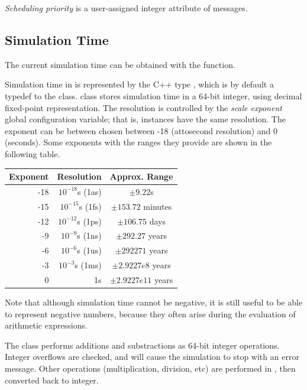 \textit{Scheduling priority} is a user-assigned integer
attribute of messages.



\subsection{Simulation Time}
\label{sec:simple-modules:simulation-time}

The current simulation time can be obtained with the  function.

Simulation time in {\opp} is represented by the C++ type ,
which is by default a typedef to the  class.
 class stores simulation time in a 64-bit integer,
using decimal fixed-point representation. The resolution is controlled
by the \textit{scale exponent} global configuration variable; that is,
 instances have the same resolution. The exponent can be
between chosen between -18 (attosecond resolution) and 0 (seconds).
Some exponents with the ranges they provide are shown in the following table.

\begin{center}
  \begin{tabular}{ | r | r | c | }
    \hline
    Exponent & Resolution & Approx. Range \\ \hline
     -18 & $10^{-18}$s (1as) & $\pm 9.22$s \\
     -15 & $10^{-15}$s (1fs) & $\pm 153.72$ minutes \\
     -12 & $10^{-12}$s (1ps) & $\pm 106.75$ days \\
     -9  & $10^{-9}$s (1ns)  & $\pm 292.27$ years \\
     -6  & $10^{-6}$s (1us)  & $\pm 292271$ years \\
     -3  & $10^{-3}$s (1ms)  & $\pm 2.9227e8$ years \\
     0   & 1s                & $\pm 2.9227e11$ years \\
    \hline
  \end{tabular}
\end{center}

Note that although simulation time cannot be negative, it is still useful to
be able to represent negative numbers, because they often arise
during the evaluation of arithmetic expressions.

The  class performs additions and substractions as 64-bit integer
operations. Integer overflows are checked, and will cause the simulation to
stop with an error message. Other operations (multiplication, division, etc)
are performed in , then converted back to integer.

